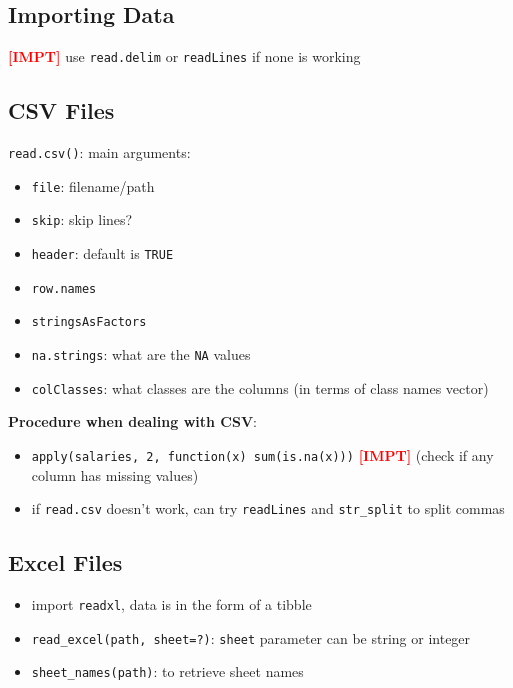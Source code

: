 \documentclass{article}
\newcommand{\impt}[0]{\textcolor{red}{\textbf{[IMPT] }}}
\begin{document}
\begin{multicols}{2}
\section{Importing Data}

\impt use \texttt{read.delim} or \texttt{readLines} if none is working

\subsection*{CSV Files}
\texttt{read.csv()}: main arguments:
\begin{itemize}
	\item \texttt{file}: filename/path
	\item \texttt{skip}: skip lines?
	\item \texttt{header}: default is \texttt{TRUE}
	\item \texttt{row.names}
	\item \texttt{stringsAsFactors}
	\item \texttt{na.strings}: what are the \texttt{NA} values
	\item \texttt{colClasses}: what classes are the columns (in terms of class names vector)\\
\end{itemize}
\textbf{Procedure when dealing with CSV}:
\begin{itemize}
	\item \texttt{apply(salaries, 2, function(x) sum(is.na(x)))} \impt (check if any column has missing values)
	\item if \texttt{read.csv} doesn't work, can try \texttt{readLines} and \texttt{str\_split} to split commas
\end{itemize}


\subsection*{Excel Files}
\begin{itemize}
	\item import \texttt{readxl}, data is in the form of a tibble
	\item \texttt{read\_excel(path, sheet=?)}: \texttt{sheet} parameter can be string or integer
	\item \texttt{sheet\_names(path)}: to retrieve sheet names
\end{itemize}


\end{multicols}
\end{document}
